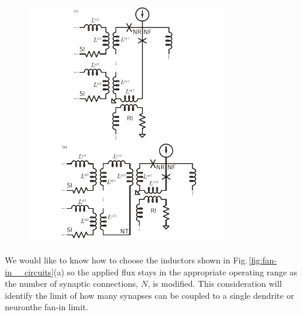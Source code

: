 \documentclass[twocolumn]{article}
\begin{document}
\begin{figure}[h!]
\includegraphics[width=8.6cm]{figures/_fig__fan-in__circuits.pdf}
\end{figure}

We would like to know how to choose the inductors shown in Fig.\,\ref{fig:fan-in__circuits}(a) so the applied flux stays in the appropriate operating range as the number of synaptic connections, $N$, is modified. This consideration will identify the limit of how many synapses can be coupled to a single dendrite or neuron\textemdash the fan-in limit. 
\end{document}
